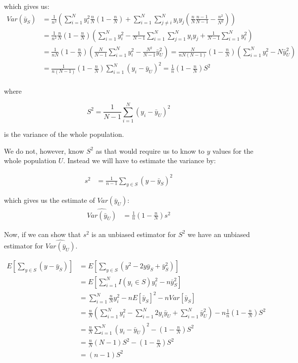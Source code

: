 \documentclass{article}
\begin{document}
which gives us:
\begin{align*}
  Var(\bar{y}_S)
  &= \frac{1}{n^2} \left( \sum_{i = 1}^N y_i^2 \frac{n}{N}(1 - \frac{n}{N}) + \sum_{i = 1}^{N}\sum_{j \neq i}^{N} y_i y_j \left( \frac{n}{N} \frac{n - 1}{N - 1} - \frac{n^2}{N^2} \right) \right) \\
  &= \frac{1}{n^2} \frac{n}{N} \left( 1 - \frac{n}{N} \right) \left( \sum_{i = 1}^{N} y_i^2 - \frac{1}{N - 1} \sum_{i = 1}^{N}\sum_{j = 1}^{N} y_i y_j + \frac{1}{N- 1} \sum_{i = 1}^{N} y_i^2 \right) \\
  &= \frac{1}{nN} \left( 1 - \frac{n}{N} \right) \left( \frac{N}{N - 1} \sum_{i = 1}^{N} y_i^2 - \frac{N^2}{N - 1} \bar{y}_U^2  \right)
  = \frac{N}{nN(N - 1)} \left( 1 - \frac{n}{N} \right) \left( \sum_{i = 1}^{N} y_i^2 -  N \bar{y}_U^2  \right) \\
  &= \frac{1}{n(N - 1)} \left( 1 - \frac{n}{N} \right) \sum_{i = 1}^{N} \left( y_i - \bar{y}_U \right)^2 
  = \frac{1}{n} \left( 1 - \frac{n}{N} \right) S^2 \\
\end{align*}

where

$$
S^2 = \frac{1}{N - 1} \sum_{i = 1}^N (y_i - \bar{y}_U)^2
$$

is the variance of the whole population.

We do not, however, know $S^2$ as that would require us to know to $y$ values
for the whole population $U$. Instead we will have to estimate the variance by:

\begin{align*}
  s^2
  &= \frac{1}{n - 1} \sum_{y \in S} \left( y - \bar{y}_S \right)^2
\end{align*}

which gives us the estimate of $Var(\bar{y}_U)$:
\begin{align*}
  \widehat{Var(\bar{y}_U)}
  &= \frac{1}{n} \left( 1 - \frac{n}{N} \right) s^2
\end{align*}

Now, if we can show that $s^2$ is an unbiased estimator for $S^2$ we have an
unbiased estimator for $\widehat{Var(\bar{y}_U)}$.

\begin{align*}
  E \left[ \sum_{y \in S} \left( y - \bar{y}_S \right) \right]
  &= E \left[ \sum_{y \in S} \left( y^2 - 2y\bar{y}_S + \bar{y}_S^2 \right) \right] \\
  &= E \left[ \sum_{i = 1}^{N} I(y_i \in S) y_i^2 - n \bar{y}_S^2 \right] \\
  &= \sum_{i = 1}^{N} \frac{n}{N} y_i^2 - n E \left[ \bar{y}_S \right]^2 - n Var \left[ \bar{y}_S \right] \\
  &= \frac{n}{N} \left( \sum_{i = 1}^{N} y_i^2 - \sum_{i = 1}^{N} 2y_i \bar{y}_U + \sum_{i = 1}^{N} \bar{y}_U^2  \right)- n \frac{1}{n} \left( 1 - \frac{n}{N} \right) S^2 \\
  &= \frac{n}{N} \sum_{i = 1}^{N} \left( y_i - \bar{y}_U \right)^2 - \left( 1 - \frac{n}{N} \right) S^2 \\
  &= \frac{n}{N} \left( N - 1 \right) S^2 - \left( 1 - \frac{n}{N} \right) S^2 \\
  &= \left( n - 1 \right) S^2
\end{align*}
\end{document}
